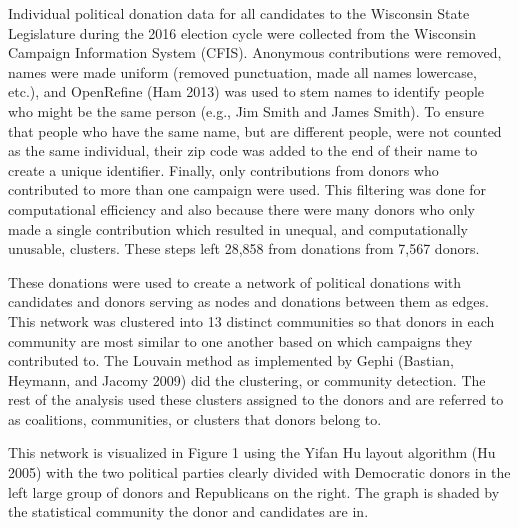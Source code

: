 \documentclass[12pt,]{article}
\begin{document}
Individual political donation data for all candidates to the Wisconsin
State Legislature during the 2016 election cycle were collected from the
Wisconsin Campaign Information System (CFIS). Anonymous contributions
were removed, names were made uniform (removed punctuation, made all
names lowercase, etc.), and OpenRefine (Ham 2013) was used to stem names
to identify people who might be the same person (e.g., Jim Smith and
James Smith). To ensure that people who have the same name, but are
different people, were not counted as the same individual, their zip
code was added to the end of their name to create a unique identifier.
Finally, only contributions from donors who contributed to more than one
campaign were used. This filtering was done for computational efficiency
and also because there were many donors who only made a single
contribution which resulted in unequal, and computationally unusable,
clusters. These steps left 28,858 from donations from 7,567 donors.

These donations were used to create a network of political donations
with candidates and donors serving as nodes and donations between them
as edges. This network was clustered into 13 distinct communities so
that donors in each community are most similar to one another based on
which campaigns they contributed to. The Louvain method as implemented
by Gephi (Bastian, Heymann, and Jacomy 2009) did the clustering, or
community detection. The rest of the analysis used these clusters
assigned to the donors and are referred to as coalitions, communities,
or clusters that donors belong to.

This network is visualized in Figure 1 using the Yifan Hu layout
algorithm (Hu 2005) with the two political parties clearly divided with
Democratic donors in the left large group of donors and Republicans on
the right. The graph is shaded by the statistical community the donor
and candidates are in.
\end{document}
